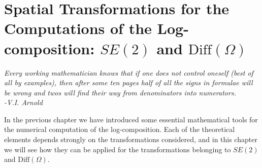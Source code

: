\chapter{Spatial Transformations for the Computations of the Log-composition: $SE(2)$ and $\text{Diff}(\Omega)$}\label{ch:spatial_transformations}


\begin{flushright}
	\emph{Every working mathematician knows that if one does not control oneself (best of all by examples), then after some ten pages half of all the signs in formulae will be wrong and twos will find their way from denominators into numerators. \\ -V.I. Arnold}
\end{flushright}

\noindent
In the previous chapter we have introduced some essential mathematical tools for the numerical computation of the log-composition. Each of the theoretical elements depends strongly on the transformations considered, and in this chapter we will see how they can be applied for the transformations belonging to $SE(2)$ and $\text{Diff}(\Omega)$.


